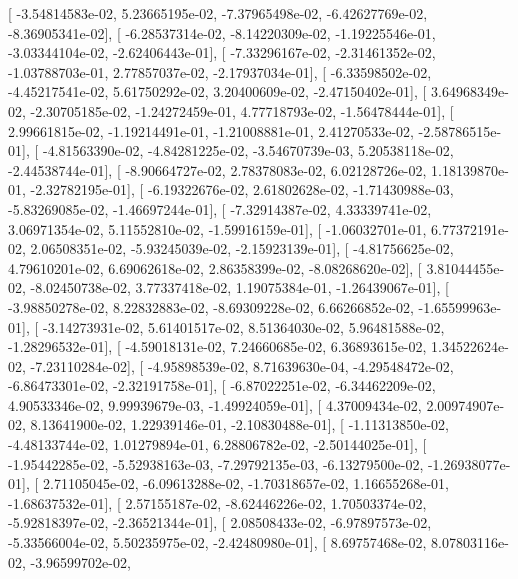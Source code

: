 \documentclass{article}
\begin{document}
       [ -3.54814583e-02,   5.23665195e-02,  -7.37965498e-02,
         -6.42627769e-02,  -8.36905341e-02],
       [ -6.28537314e-02,  -8.14220309e-02,  -1.19225546e-01,
         -3.03344104e-02,  -2.62406443e-01],
       [ -7.33296167e-02,  -2.31461352e-02,  -1.03788703e-01,
          2.77857037e-02,  -2.17937034e-01],
       [ -6.33598502e-02,  -4.45217541e-02,   5.61750292e-02,
          3.20400609e-02,  -2.47150402e-01],
       [  3.64968349e-02,  -2.30705185e-02,  -1.24272459e-01,
          4.77718793e-02,  -1.56478444e-01],
       [  2.99661815e-02,  -1.19214491e-01,  -1.21008881e-01,
          2.41270533e-02,  -2.58786515e-01],
       [ -4.81563390e-02,  -4.84281225e-02,  -3.54670739e-03,
          5.20538118e-02,  -2.44538744e-01],
       [ -8.90664727e-02,   2.78378083e-02,   6.02128726e-02,
          1.18139870e-01,  -2.32782195e-01],
       [ -6.19322676e-02,   2.61802628e-02,  -1.71430988e-03,
         -5.83269085e-02,  -1.46697244e-01],
       [ -7.32914387e-02,   4.33339741e-02,   3.06971354e-02,
          5.11552810e-02,  -1.59916159e-01],
       [ -1.06032701e-01,   6.77372191e-02,   2.06508351e-02,
         -5.93245039e-02,  -2.15923139e-01],
       [ -4.81756625e-02,   4.79610201e-02,   6.69062618e-02,
          2.86358399e-02,  -8.08268620e-02],
       [  3.81044455e-02,  -8.02450738e-02,   3.77337418e-02,
          1.19075384e-01,  -1.26439067e-01],
       [ -3.98850278e-02,   8.22832883e-02,  -8.69309228e-02,
          6.66266852e-02,  -1.65599963e-01],
       [ -3.14273931e-02,   5.61401517e-02,   8.51364030e-02,
          5.96481588e-02,  -1.28296532e-01],
       [ -4.59018131e-02,   7.24660685e-02,   6.36893615e-02,
          1.34522624e-02,  -7.23110284e-02],
       [ -4.95898539e-02,   8.71639630e-04,  -4.29548472e-02,
         -6.86473301e-02,  -2.32191758e-01],
       [ -6.87022251e-02,  -6.34462209e-02,   4.90533346e-02,
          9.99939679e-03,  -1.49924059e-01],
       [  4.37009434e-02,   2.00974907e-02,   8.13641900e-02,
          1.22939146e-01,  -2.10830488e-01],
       [ -1.11313850e-02,  -4.48133744e-02,   1.01279894e-01,
          6.28806782e-02,  -2.50144025e-01],
       [ -1.95442285e-02,  -5.52938163e-03,  -7.29792135e-03,
         -6.13279500e-02,  -1.26938077e-01],
       [  2.71105045e-02,  -6.09613288e-02,  -1.70318657e-02,
          1.16655268e-01,  -1.68637532e-01],
       [  2.57155187e-02,  -8.62446226e-02,   1.70503374e-02,
         -5.92818397e-02,  -2.36521344e-01],
       [  2.08508433e-02,  -6.97897573e-02,  -5.33566004e-02,
          5.50235975e-02,  -2.42480980e-01],
       [  8.69757468e-02,   8.07803116e-02,  -3.96599702e-02,
\end{document}
